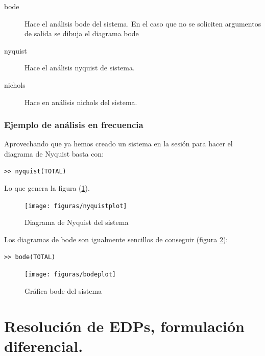 \begin{description}
\item [bode]Hace el análisis bode del sistema. En el caso
que no se soliciten argumentos de salida se dibuja el diagrama bode 
\item [nyquist]Hace el análisis nyquist de sistema. 
\item [nichols]Hace en análisis nichols del sistema. 
\end{description}

\subsubsection{Ejemplo de análisis en frecuencia}

\label{sec:ejercicioanalisis} Aprovechando que ya hemos creado un
sistema en la sesión para hacer el diagrama de Nyquist basta con:
\begin{verbatim}
>> nyquist(TOTAL)
\end{verbatim} Lo que genera la figura (\ref{fig:nyquist}). %
\begin{figure}
 \centering
    \texttt{[image: figuras/nyquistplot]}


\caption{\label{fig:nyquist}Diagrama de Nyquist del sistema}
\end{figure}


Los diagramas de bode son igualmente sencillos de conseguir (figura
\ref{cap:bode}): 
\begin{verbatim}
>> bode(TOTAL)
\end{verbatim}%
\begin{figure}
 \centering
    \texttt{[image: figuras/bodeplot]}

\caption{\label{cap:bode}Gráfica bode del sistema}
\end{figure}



\section{Resolución de EDPs, formulación diferencial.}
